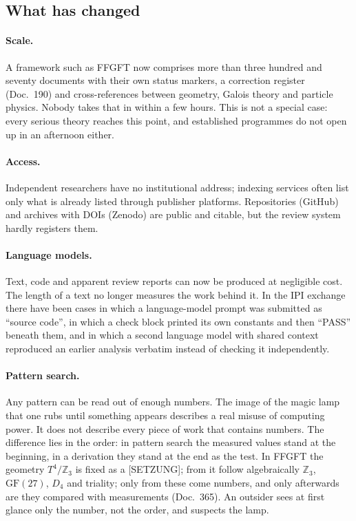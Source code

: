 \subsection{What has changed}

\paragraph{Scale.} A framework such as FFGFT now comprises more than three hundred and
seventy documents with their own status markers, a correction register (Doc.~190) and
cross-references between geometry, Galois theory and particle physics. Nobody takes that
in within a few hours. This is not a special case: every serious theory reaches this
point, and established programmes do not open up in an afternoon either.

\paragraph{Access.} Independent researchers have no institutional address; indexing
services often list only what is already listed through publisher platforms.
Repositories (GitHub) and archives with DOIs (Zenodo) are public and citable, but the
review system hardly registers them.

\paragraph{Language models.} Text, code and apparent review reports can now be produced
at negligible cost. The length of a text no longer measures the work behind it. In the
IPI exchange there have been cases in which a language-model prompt was submitted as
``source code'', in which a check block printed its own constants and then ``PASS''
beneath them, and in which a second language model with shared context reproduced an
earlier analysis verbatim instead of checking it independently.

\paragraph{Pattern search.} Any pattern can be read out of enough numbers. The image of
the magic lamp that one rubs until something appears describes a real misuse of computing
power. It does not describe every piece of work that contains numbers. The difference lies
in the order: in pattern search the measured values stand at the beginning, in a
derivation they stand at the end as the test. In FFGFT the geometry $T^4/\mathbb{Z}_3$ is
fixed as a {[SETZUNG]}; from it follow algebraically $\mathbb{Z}_3$, $\mathrm{GF}(27)$,
$D_4$ and triality; only from these come numbers, and only afterwards are they compared
with measurements (Doc.~365). An outsider sees at first glance only the number, not the
order, and suspects the lamp.

